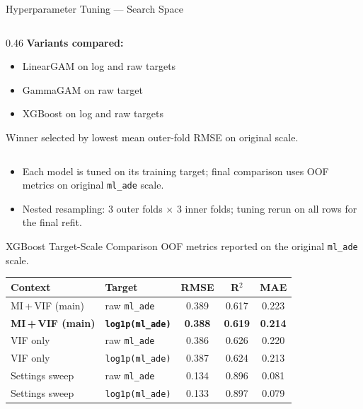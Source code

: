 \begin{frame}[noframenumbering]{Hyperparameter Tuning — Search Space}
\begin{columns}[T]
\begin{column}{0.46\textwidth}
      \textbf{Variants compared:}
      \begin{itemize}\setlength\itemsep{0.05em}
        \item LinearGAM on log and raw targets
        \item GammaGAM on raw target
        \item XGBoost on log and raw targets
      \end{itemize}
      Winner selected by lowest mean outer-fold RMSE on original scale.
    \end{column}
  \end{columns}
  \vspace{0.4em}
  \scriptsize
  \begin{itemize}\setlength\itemsep{0.08em}
    \item Each model is tuned on its training target; final comparison uses OOF
      metrics on original \texttt{ml\_ade} scale.
    \item Nested resampling: $3$ outer folds $\times$ $3$ inner folds; tuning
      rerun on all rows for the final refit.
  \end{itemize}
\end{frame}

\begin{frame}[noframenumbering]{XGBoost Target-Scale Comparison}
  \footnotesize
  OOF metrics reported on the original \texttt{ml\_ade} scale.
  \vspace{0.35em}

  \begin{center}
  \scriptsize
  \renewcommand{\arraystretch}{1.12}
  \begin{tabular}{llccc}
    \toprule
    \textbf{Context} & \textbf{Target} & \textbf{RMSE} & \textbf{R$^2$} & \textbf{MAE} \\
    \midrule
    MI\,+\,VIF (main) & raw \texttt{ml\_ade} & 0.389 & 0.617 & 0.223 \\
    \textcolor{lmugreen}{\textbf{MI\,+\,VIF (main)}} &
      \textcolor{lmugreen}{\textbf{\texttt{log1p(ml\_ade)}}}
      & \textcolor{lmugreen}{\textbf{0.388}}
      & \textcolor{lmugreen}{\textbf{0.619}}
      & \textcolor{lmugreen}{\textbf{0.214}} \\
    VIF only & raw \texttt{ml\_ade} & 0.386 & 0.626 & 0.220 \\
    VIF only & \texttt{log1p(ml\_ade)} & 0.387 & 0.624 & 0.213 \\
    Settings sweep & raw \texttt{ml\_ade} & 0.134 & 0.896 & 0.081 \\
    Settings sweep & \texttt{log1p(ml\_ade)} & 0.133 & 0.897 & 0.079 \\
    \bottomrule
  \end{tabular}
  \end{center}
\end{frame}

